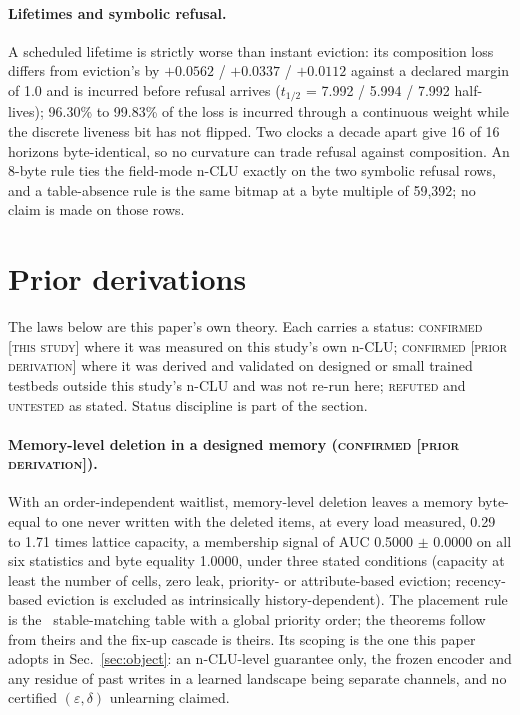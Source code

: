 \documentclass{article} %
\begin{document}
\paragraph{Lifetimes and symbolic refusal.} A scheduled lifetime is strictly worse than instant
eviction: its composition loss differs from eviction's by $+0.0562$ / $+0.0337$ / $+0.0112$ against a
declared margin of 1.0 and is incurred before refusal arrives ($t_{1/2}$ = 7.992 / 5.994 / %
7.992 half-lives); 96.30\% to 99.83\% of the loss is incurred through a continuous weight while the
discrete liveness bit has not flipped. %
Two clocks a decade apart give 16 of 16 horizons byte-identical, so no curvature can trade refusal
against composition. An 8-byte rule ties the field-mode n-CLU exactly on the two symbolic refusal rows,
and a table-absence rule is the same bitmap at a byte multiple of 59,392; no claim is made on those
rows. %

\section{Prior derivations}
\label{app:shorts}

The laws below
are this paper's own theory. Each carries a status: \textsc{confirmed [this study]} where it was
measured on this study's own n-CLU; \textsc{confirmed [prior derivation]} where it was derived and
validated on designed or small trained testbeds outside this study's n-CLU and was not re-run
here; \textsc{refuted} and \textsc{untested} as stated. Status discipline is part of the section.


\paragraph{Memory-level deletion in a designed memory (\textsc{confirmed [prior
derivation]}).} With an order-independent waitlist, memory-level deletion leaves a memory
byte-equal to one never written with the deleted items, at every load measured, 0.29 to 1.71 times lattice capacity, a membership signal of AUC 0.5000 $\pm$ 0.0000 on all
six statistics and byte equality 1.0000, under three stated conditions (capacity at least the number
of cells, zero leak, priority- or attribute-based eviction; recency-based eviction is excluded as
intrinsically history-dependent). %
The placement rule is the~\citet{blelloch_strongly_2007} stable-matching table with a global priority order;
the theorems follow from theirs and the fix-up cascade is theirs. Its scoping is the one this
paper adopts in Sec.~\ref{sec:object}: an n-CLU-level guarantee only, the frozen encoder and any
residue of past writes in a learned landscape being separate channels, and no certified
$(\varepsilon,\delta)$ unlearning claimed. %
\end{document}
